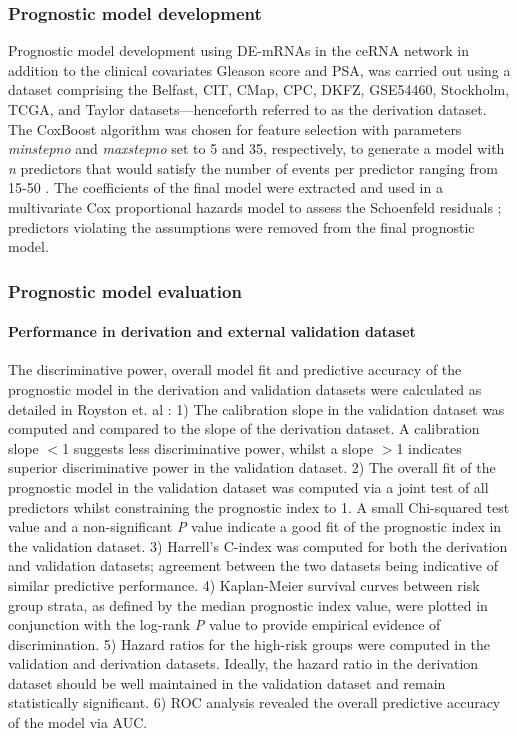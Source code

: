 \subsubsection{Prognostic model development}\label{methods6}
Prognostic model development using DE-mRNAs in the ceRNA network in addition to the clinical covariates Gleason score and PSA, was carried out using a dataset comprising the Belfast, CIT, CMap, CPC, DKFZ, GSE54460, Stockholm, TCGA, and Taylor datasets—henceforth referred to as the derivation dataset. The CoxBoost algorithm was chosen for feature selection with parameters \textit{minstepno} and \textit{maxstepno} set to 5 and 35, respectively, to generate a model with \textit{n} predictors that would satisfy the number of events per predictor ranging from 15-50 \cite{Harrellbook, Ogundimu2016Aug, Wynants2015Dec, Austin2014Nov}. The coefficients of the final model were extracted and used in a multivariate Cox proportional hazards model to assess the Schoenfeld residuals \cite{Schoenfeld1982}; predictors violating the assumptions were removed from the final prognostic model. 

\subsubsection{Prognostic model evaluation}\label{methods7}
\paragraph{Performance in derivation and external validation dataset}\label{methods71}
The discriminative power, overall model fit and predictive accuracy of the prognostic model in the derivation and validation datasets were calculated as detailed in Royston et. al \cite{Royston2013}: 1) The calibration slope in the validation dataset was computed and compared to the slope of the derivation dataset. A calibration slope $<$1 suggests less discriminative power, whilst a slope $>$1 indicates superior discriminative power in the validation dataset. 2) The overall fit of the prognostic model in the validation dataset was computed via a joint test of all predictors whilst constraining the prognostic index to 1. A small Chi-squared test value and a non-significant \textit{P} value indicate a good fit of the prognostic index in the validation dataset. 3) Harrell's C-index was computed for both the derivation and validation datasets; agreement between the two datasets being indicative of similar predictive performance. 4) Kaplan-Meier survival curves between risk group strata, as defined by the median prognostic index value, were plotted in conjunction with the log-rank \textit{P} value to provide empirical evidence of discrimination. 5) Hazard ratios for the high-risk groups were computed in the validation and derivation datasets. Ideally, the hazard ratio in the derivation dataset should be well maintained in the validation dataset and remain statistically significant. 6) ROC analysis revealed the overall predictive accuracy of the model via AUC. 

